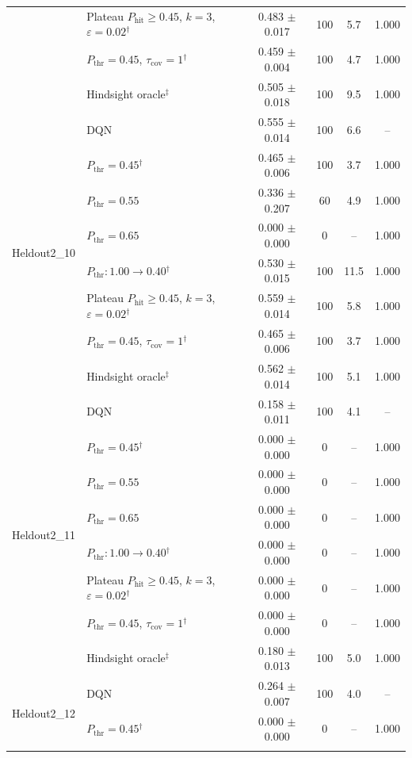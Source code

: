 \begin{table}[htbp]
\begin{tabular}{llcccc}
 & Plateau $P_{\mathrm{hit}}\geq0.45$, $k=3$, $\varepsilon=0.02$$^{\dagger}$ & 0.483 $\pm$ 0.017 & 100 & 5.7 & 1.000 \\
 & $P_{\mathrm{thr}}=0.45$, $\tau_{\mathrm{cov}}=1$$^{\dagger}$ & 0.459 $\pm$ 0.004 & 100 & 4.7 & 1.000 \\
 & Hindsight oracle$^{\ddagger}$ & 0.505 $\pm$ 0.018 & 100 & 9.5 & 1.000 \\
\midrule
\multirow{8}{*}{Heldout2\_10} & DQN & 0.555 $\pm$ 0.014 & 100 & 6.6 & -- \\
 & $P_{\mathrm{thr}}=0.45$$^{\dagger}$ & 0.465 $\pm$ 0.006 & 100 & 3.7 & 1.000 \\
 & $P_{\mathrm{thr}}=0.55$ & 0.336 $\pm$ 0.207 & 60 & 4.9 & 1.000 \\
 & $P_{\mathrm{thr}}=0.65$ & 0.000 $\pm$ 0.000 & 0 & -- & 1.000 \\
 & $P_{\mathrm{thr}}: 1.00 \to 0.40$$^{\dagger}$ & 0.530 $\pm$ 0.015 & 100 & 11.5 & 1.000 \\
 & Plateau $P_{\mathrm{hit}}\geq0.45$, $k=3$, $\varepsilon=0.02$$^{\dagger}$ & 0.559 $\pm$ 0.014 & 100 & 5.8 & 1.000 \\
 & $P_{\mathrm{thr}}=0.45$, $\tau_{\mathrm{cov}}=1$$^{\dagger}$ & 0.465 $\pm$ 0.006 & 100 & 3.7 & 1.000 \\
 & Hindsight oracle$^{\ddagger}$ & 0.562 $\pm$ 0.014 & 100 & 5.1 & 1.000 \\
\midrule
\multirow{8}{*}{Heldout2\_11} & DQN & 0.158 $\pm$ 0.011 & 100 & 4.1 & -- \\
 & $P_{\mathrm{thr}}=0.45$$^{\dagger}$ & 0.000 $\pm$ 0.000 & 0 & -- & 1.000 \\
 & $P_{\mathrm{thr}}=0.55$ & 0.000 $\pm$ 0.000 & 0 & -- & 1.000 \\
 & $P_{\mathrm{thr}}=0.65$ & 0.000 $\pm$ 0.000 & 0 & -- & 1.000 \\
 & $P_{\mathrm{thr}}: 1.00 \to 0.40$$^{\dagger}$ & 0.000 $\pm$ 0.000 & 0 & -- & 1.000 \\
 & Plateau $P_{\mathrm{hit}}\geq0.45$, $k=3$, $\varepsilon=0.02$$^{\dagger}$ & 0.000 $\pm$ 0.000 & 0 & -- & 1.000 \\
 & $P_{\mathrm{thr}}=0.45$, $\tau_{\mathrm{cov}}=1$$^{\dagger}$ & 0.000 $\pm$ 0.000 & 0 & -- & 1.000 \\
 & Hindsight oracle$^{\ddagger}$ & 0.180 $\pm$ 0.013 & 100 & 5.0 & 1.000 \\
\midrule
\multirow{8}{*}{Heldout2\_12} & DQN & 0.264 $\pm$ 0.007 & 100 & 4.0 & -- \\
 & $P_{\mathrm{thr}}=0.45$$^{\dagger}$ & 0.000 $\pm$ 0.000 & 0 & -- & 1.000 \\
$$
\end{tabular}
\end{table}
